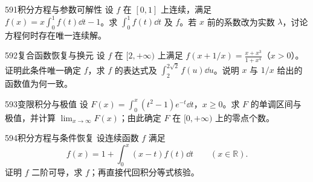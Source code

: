 \begin{exercise}{591}{积分方程与参数可解性}
设 $f$ 在 $[0,1]$ 上连续，满足 $f(x)=x\int_0^1f(t)\dd t-1$。求 $\int_0^1f(t)\dd t$ 及 $f$。若 $x$ 前的系数改为实数 $\lambda$，讨论方程何时存在唯一连续解。
\end{exercise}
\begin{exercise}{592}{复合函数恢复与换元}
设 $f$ 在 $[2,+\infty)$ 上满足 $f(x+1/x)=\frac{x+x^3}{1+x^4}$（$x>0$）。证明此条件唯一确定 $f$，求 $f$ 的表达式及 $\int_2^{2\sqrt2}f(u)\dd u$。说明 $x$ 与 $1/x$ 给出的函数值为何一致。
\end{exercise}
\begin{exercise}{593}{变限积分与极值}
设 $F(x)=\int_0^x(t^2-1)e^{-t}\dd t$，$x\ge0$。求 $F$ 的单调区间与极值，并计算 $\lim_{x\to\infty}F(x)$；由此确定 $F$ 在 $[0,+\infty)$ 上的零点个数。
\end{exercise}
\begin{exercise}{594}{积分方程与条件恢复}
设连续函数 $f$ 满足
\[
f(x)=1+\int_0^x(x-t)f(t)\dd t\qquad(x\in\mathbb R).
\]
证明 $f$ 二阶可导，求 $f$；再直接代回积分等式核验。
\end{exercise}
